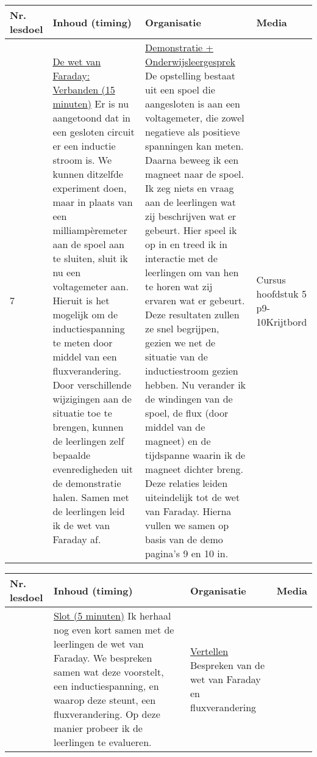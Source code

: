 \begin{landscape}
\begin{tabularx}{1.56\textwidth}{|p{1.5cm}|p{9cm}|X|p{4cm}|}
	\hline
	\textbf{Nr. lesdoel } & \textbf{Inhoud (timing)}  & \textbf{Organisatie } & \textbf{Media } \\ \hline
	7\newline\newline 8\newline\newline 9& \underline{De wet van Faraday:} \underline{Verbanden (15 minuten)}\newline
	Er is nu aangetoond dat in een gesloten circuit er een inductie stroom is. We kunnen ditzelfde experiment doen, maar in plaats van een milliampèremeter aan de spoel aan te sluiten, sluit ik nu een voltagemeter aan. Hieruit is het mogelijk om de inductiespanning te meten door middel van een fluxverandering. Door verschillende wijzigingen aan de situatie toe te brengen, kunnen de leerlingen zelf bepaalde evenredigheden uit de demonstratie halen. Samen met de leerlingen leid ik de wet van Faraday af.
	&  \underline{Demonstratie + Onderwijsleergesprek}\newline 
	De opstelling bestaat uit een spoel die aangesloten is aan een voltagemeter, die zowel negatieve als positieve spanningen kan meten. Daarna beweeg ik een magneet naar de spoel. Ik zeg niets en vraag aan de leerlingen wat zij beschrijven wat er gebeurt. Hier speel ik op in en treed ik in interactie met de leerlingen om van hen te horen wat zij ervaren wat er gebeurt.	Deze resultaten zullen ze snel begrijpen, gezien we net de situatie van de inductiestroom gezien hebben. Nu verander ik de windingen van de spoel, de flux (door middel van de magneet) en de tijdspanne waarin ik de magneet dichter breng. Deze relaties leiden uiteindelijk tot de wet van Faraday. Hierna vullen we samen op basis van de demo pagina's 9 en 10 in.
	&  Cursus hoofdstuk 5 p9-10\newline\newline Krijtbord
	\\ \hline
\end{tabularx}\vspace{5mm}


\begin{tabularx}{1.56\textwidth}{|p{1.5cm}|p{9cm}|X|p{4cm}|}
	\hline
	\textbf{Nr. lesdoel } & \textbf{Inhoud (timing)}  & \textbf{Organisatie } & \textbf{Media } \\ \hline
	& \underline{Slot (5 minuten)}\newline
	Ik herhaal nog even kort samen met de leerlingen de wet van Faraday. We bespreken samen wat deze voorstelt, een inductiespanning, en waarop deze steunt, een fluxverandering. Op deze manier probeer ik de leerlingen te evalueren.
	&  \underline{Vertellen}\newline 
	Bespreken van de wet van Faraday en fluxverandering
	&  
	\\ \hline
\end{tabularx}




	
\end{landscape}


